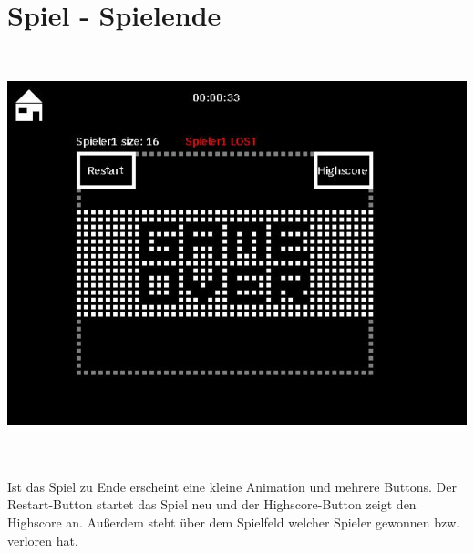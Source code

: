 \newpage
\section{Spiel - Spielende}
\label{Spiel_-_Spielende}
\textcolor{white}{easily}
\newline 
\begin{minipage}[X]{1.1\textwidth}
 \centering
 \includegraphics[scale=0.5]{bilder/Spielende}
 \label{fig:spielende}
\end{minipage}
\newline \\ \\ 
	Ist das Spiel zu Ende erscheint eine kleine Animation und mehrere Buttons. Der Restart-Button startet das Spiel neu und der Highscore-Button zeigt den Highscore an. Au{\ss}erdem steht {\"u}ber dem Spielfeld welcher Spieler gewonnen bzw. verloren hat.  

%
